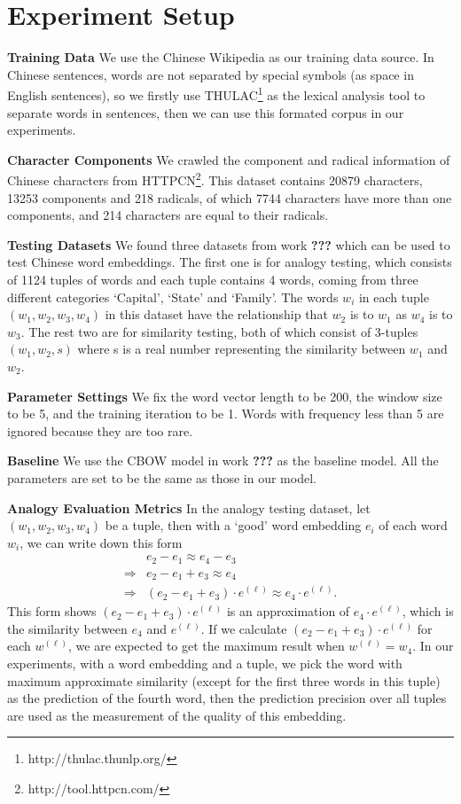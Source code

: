 \section{Experiment Setup}

\textbf{Training Data} We use the Chinese Wikipedia as our training data source. In Chinese sentences, words are not separated by special symbols (as space in English sentences), so we firstly use THULAC\footnote{http://thulac.thunlp.org/} as the lexical analysis tool to separate words in sentences, then we can use this formated corpus in our experiments.

\textbf{Character Components} We crawled the component and radical information of Chinese characters from HTTPCN\footnote{http://tool.httpcn.com/}. This dataset contains 20879 characters, 13253 components and 218 radicals, of which 7744 characters have more than one components, and 214 characters are equal to their radicals.

\textbf{Testing Datasets} We found three datasets from work \textbf{???} which can be used to test Chinese word embeddings. The first one is for analogy testing, which consists of 1124 tuples of words and each tuple contains 4 words, coming from three different categories `Capital', `State' and `Family'. The words $w_i$ in each tuple $(w_1, w_2, w_3, w_4)$ in this dataset have the relationship that $w_2$ is to $w_1$ as $w_4$ is to $w_3$. The rest two are for similarity testing, both of which consist of 3-tuples $(w_1, w_2, s)$ where s is a real number representing the similarity between $w_1$ and $w_2$.

\textbf{Parameter Settings} We fix the word vector length to be 200, the window size to be 5, and the training iteration to be 1. Words with frequency less than 5 are ignored because they are too rare.

\textbf{Baseline} We use the CBOW model in work \textbf{???} as the baseline model. All the parameters are set to be the same as those in our model.

\textbf{Analogy Evaluation Metrics} In the analogy testing dataset, let $(w_1, w_2, w_3, w_4)$ be a tuple, then with a `good' word embedding $e_i$ of each word $w_i$, we can write down this form
\begin{align*}
	& e_2 - e_1 \approx e_4 - e_3 \\
	\Rightarrow & e_2 - e_1 + e_3 \approx e_4 \\
	\Rightarrow & (e_2 - e_1 + e_3)\cdot e^{(\ell)} \approx e_4\cdot e^{(\ell)}.
\end{align*}
This form shows $(e_2 - e_1 + e_3)\cdot e^{(\ell)}$ is an approximation of $e_4\cdot e^{(\ell)}$, which is the similarity between $e_4$ and $e^{(\ell)}$. If we calculate $(e_2 - e_1 + e_3)\cdot e^{(\ell)}$ for each $w^{(\ell)}$, we are expected to get the maximum result when $w^{(\ell)}=w_4$. In our experiments, with a word embedding and a tuple, we pick the word with maximum approximate similarity (except for the first three words in this tuple) as the prediction of the fourth word, then the prediction precision over all tuples are used as the measurement of the quality of this embedding.

